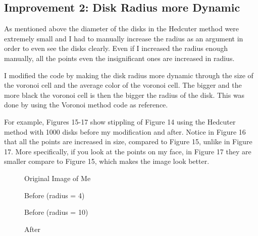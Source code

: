 \documentclass[11pt]{article}
\begin{document}
\subsection{Improvement 2: Disk Radius more Dynamic}

As mentioned above the diameter of the disks in the Hedcuter method were extremely small and I had to manually increase the radius as an argument in order to even see the disks clearly. Even if I increased the radius enough manually, all the points even the insignificant ones are increased in radius. 

I modified the code by making the disk radius more dynamic through the size of the voronoi cell and the average color of the voronoi cell. The bigger and the more black the voronoi cell is then the bigger the radius of the disk. This was done by using the 
Voronoi method code as reference. 

For example, Figures 15-17 show stippling of Figure 14 using the Hedcuter method with 1000 disks before my modification and after. Notice in Figure 16 that all the points are increased in size, compared to Figure 15, unlike in Figure 17. More specifically, if you look at the points on my face, in Figure 17 they are smaller compare to Figure 15, which makes the image look better. 

\hfill

\begin{figure}[!htb]
    \centering 
    \begin{minipage}{0.48\textwidth}
        \centering
        \caption{Original Image of Me}
    \end{minipage}\hfill
    \begin{minipage}{0.48\textwidth}
        \centering
        \caption{Before (radius = 4)}
    \end{minipage}
\end{figure}

\begin{figure}[!htb]
    \begin{minipage}{0.48\textwidth}
        \centering
        \caption{Before (radius = 10)}
    \end{minipage}\hfill
    \begin{minipage}{0.48\textwidth}
        \centering
        \caption{After}
    \end{minipage}
\end{figure}
\end{document}
